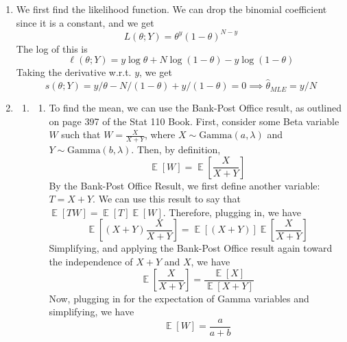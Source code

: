 \documentclass[submit]{harvardml}
\newenvironment{ans}{
  \begin{enumerate}
  \color{blue}
}{
  \end{enumerate}
  \color{black}
}
\DeclareMathOperator*{\mean}{\mathbb{E}}
\begin{document}
\newpage
\begin{ans}
    \item We first find the likelihood function. We can drop the binomial coefficient since it is a constant, and we get 
    $$
    L(\theta;  Y) = \theta^{y}(1 - \theta)^{N -y}
    $$
    The log of this is 
    $$
    \ell (\theta;  Y) = y \log \theta + N \log (1 - \theta) - y\log (1 - \theta)
    $$
    Taking the derivative w.r.t. $y$, we get
    $$
    s (\theta;  Y) = y/\theta - N / (1 - \theta) + y/ (1 - \theta) = 0 \implies \hat \theta _{MLE} = y/N
    $$
    \item  
        \begin{enumerate} 
        \item
        \begin{enumerate}
            \item To find the mean, we can use the Bank-Post Office result, as outlined on page 397 of the Stat 110 Book. First, consider some Beta variable $W$ such that $W = \frac{X}{X + Y}$, where $X \sim \text{Gamma}(a, \lambda)$ and $Y \sim \text{Gamma}(b, \lambda)$. Then, by definition, 
            $$
            \mean[W] = \mean [\frac{X}{X + Y}]
            $$
            By the Bank-Post Office Result, we first define another variable: $T = X + Y$. We can use this result to say that $\mean[TW] = \mean[T]\mean[W]$. Therefore, plugging in, we have 
            $$
            \mean \left[(X + Y) \frac{X}{X + Y}\right] = \mean [(X + Y)]\mean \left[\frac{X}{X + Y}\right]
            $$
            Simplifying, and applying the Bank-Post Office result again toward the independence of $X + Y$ and $X$, we have
            $$
            \mean \left[\frac{X}{X + Y}\right] = \frac{\mean [X]}{\mean[X + Y]}
            $$
            Now, plugging in for the expectation of Gamma variables and simplifying, we have
            $$
            \mean [W] = \frac{a}{a + b}
            $$
            

\end{enumerate}
\end{enumerate}
\end{ans}
\end{document}

